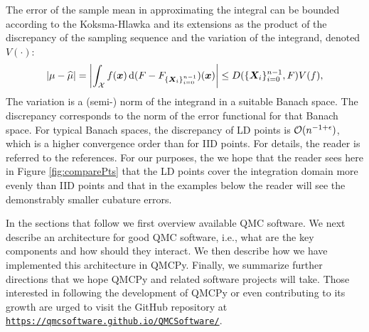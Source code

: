 \documentclass[graybox,footinfo]{svmult}
\newcommand{\QMCPYabs}[1]{\ensuremath{{\left \lvert #1 \right \rvert}}}
\newcommand{\hmu}{\widehat{\mu}}
\begin{document}
The error of the sample mean in approximating the integral can be bounded according to the Koksma-Hlawka and its extensions as the product of the discrepancy of the sampling sequence and the variation of the integrand, denoted $V(\cdot)$:
\begin{equation}
	\QMCPYabs{\mu - \hmu} = \QMCPYabs{\int_{\calX} f(\bsx) \, \D (F - F_{\{\bsX_i\}_{i=0}^{n-1}}) (\bsx)} \le D(\{\bsX_i\}_{i=0}^{n-1}, F) V(f),
\end{equation} 
The variation is a (semi-) norm of the integrand in a suitable Banach space.  The discrepancy corresponds to the norm of the error functional for that Banach space.  For typical Banach spaces, the discrepancy of LD points is ${\mathcal{O}}(n^{-1+\epsilon})$, which is a higher convergence order than for IID points.  For details, the reader is referred to the references.  For our purposes, the we hope  that the reader sees here in Figure \ref{fig:comparePts} that the LD points cover the integration domain more evenly than IID points and that in the examples below the reader will see the demonstrably smaller cubature errors.

In the sections that follow we first overview available QMC software.  We next describe an architecture for good QMC software, i.e., what are the key components and how should they interact.  We then describe how we have implemented this architecture in QMCPy.  Finally, we summarize further directions that we hope QMCPy and related software projects will take.  Those interested in following the development of QMCPy or even contributing to its growth are urged to visit the GitHub repository at \href{https://qmcsoftware.github.io/QMCSoftware/}{\nolinkurl{https://qmcsoftware.github.io/QMCSoftware/}}.
\end{document}
